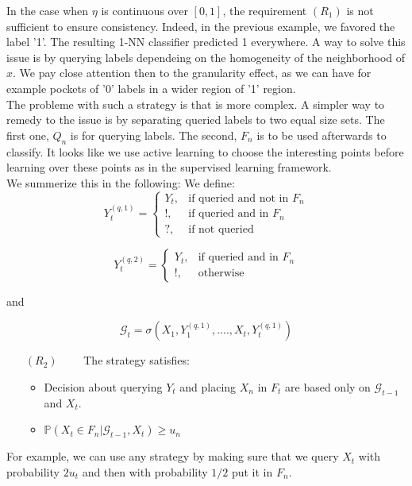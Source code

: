 \documentclass[onecolumn,12pt]{article}
\begin{document}
In the case when $\eta$ is continuous over $[0,1]$, the requirement $(R_1)$ is not sufficient to ensure consistency. Indeed, in the previous example, we favored the label '1'. The resulting 1-NN classifier predicted 1 everywhere. A way to solve this issue is by querying labels dependeing on the homogeneity of the neighborhood of $x$. We pay close attention then to the granularity effect, as we can have for example pockets of '0' labels in a wider region of '1' region.\\

The probleme with such a strategy is that is more complex. A simpler way to remedy to the issue is by separating queried labels to two equal size sets. The first one, $Q_n$ is for querying labels. The second, $ F_n$ is to be used afterwards to classify. It looks like we use active learning to choose the interesting points before learning over these points as in the supervised learning framework.\\

We summerize this in the following:
We define:
$$Y^{(q,1)}_t=\begin{cases}
Y_t, & \text{if queried and not in } F_n\\
! , & \text{if queried and in }F_n \\
?, & \text{if  not queried}
\end{cases}$$


$$Y^{(q,2)}_t=\begin{cases}
Y_t, & \text{if queried and in }F_n \\
! , & \text{otherwise }
\end{cases}$$

and

$$\mathscr{G}_t=\sigma(X_1,Y^{(q,1)}_1, ...., X_t,Y^{(q,1)}_t)$$

\begin{itemize}
\item[$(R_2)$] \  \ \ \ The strategy satisfies:
\begin{itemize}
\item Decision about querying $Y_t$ and placing $X_n$ in $F_t$ are based only on $\mathscr{G}_{t-1}$ and $X_t$.
\item $\mathbb{P}(X_t \in F_n|\mathscr{G}_{t-1},X_t) \geq u_n$
\end{itemize}
\end{itemize}

For example, we can use any strategy by making sure that we query  $X_t$ with probability $2 u_t$ and then with probability $1/2$ put it in $F_n$.
\end{document}
